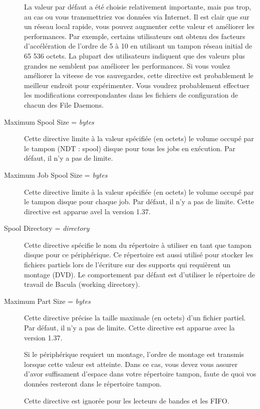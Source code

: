 \begin{description}
   La valeur par d\'efaut a \'et\'e choisie relativement importante, mais pas trop, 
   au cas ou vous transmettriez vos donn\'ees via Internet. Il est clair que sur 
   un r\'eseau local rapide, vous pouvez augmenter cette valeur et am\'eliorer les 
   performances. Par exemple, certains utilisateurs ont obtenu des facteurs 
   d'acc\'el\'eration de l'ordre de 5 \`a 10 en utilisant un tampon r\'eseau initial de 
   65 536 octets. La plupart des utilisateurs indiquent que des valeurs plus 
   grandes ne semblent pas am\'eliorer les performances. Si vous voulez am\'eliorer 
   la viteese de vos sauvegardes, cette directive est probablement le meilleur 
   endroit pour exp\'erimenter. Vous voudrez probablement effectuer les 
   modifications correspondantes dans les fichiers de configuration de chacun  
   des File Daemons.
   
\item [Maximum Spool Size = {\it bytes}]
   Cette directive limite \`a la valeur sp\'ecifi\'ee (en octets) le volume occup\'e par 
   le tampon (NDT : spool) disque pour tous les jobs en ex\'ecution. Par d\'efaut, il n'y a 
   pas de limite.
   
\item [Maximum Job Spool Size = {\it bytes}]
   Cette directive limite \`a la valeur sp\'ecifi\'ee (en octets) le volume occup\'e par 
   le tampon disque pour chaque job. Par d\'efaut, il n'y a pas de limite. Cette 
   directive est apparue avel la version 1.37.
   
\item [Spool Directory = {\it directory}]
   Cette directive sp\'ecifie le nom du r\'epertoire \`a utiliser en tant que tampon 
   disque pour ce p\'eriph\'erique. Ce r\'epertoire est aussi utilis\'e pour stocker 
   les fichiers partiels lors de l'\'ecriture sur des supports qui requi\`erent 
   un montage (DVD). Le comportement par d\'efaut est d'utiliser le r\'epertoire 
   de travail de Bacula (working directory).

\item [Maximum Part Size = {\it bytes}]
   Cette directive pr\'ecise la taille maximale (en octets) d'un fichier partiel. Par d\'efaut, 
   il n'y a pas de limite. Cette directive est apparue avec la version 1.37.

   Si le p\'eriph\'erique requiert un montage, l'ordre de montage est transmis lorsque 
   cette valeur est atteinte. Dans ce cas, vous devez vous assurer d'avor suffisament 
   d'espace dans votre r\'epertoire tampon, faute de quoi vos donn\'ees resteront dans le 
   r\'epertoire tampon.

   Cette directive est ignor\'ee pour les lecteurs de bandes et les FIFO.

\end{description}

